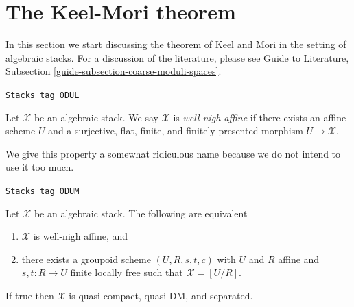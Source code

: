 \section{The Keel-Mori theorem}
\label{stacks-more-morphisms-section-Keel-Mori}
In this section we start discussing the theorem of Keel and Mori
in the setting of algebraic stacks. For a discussion of the
literature, please see Guide to Literature, Subsection
\ref{guide-subsection-coarse-moduli-spaces}.

\begin{definition}
\label{stacks-more-morphisms-definition-well-nigh-affine}
\href{https://stacks.math.columbia.edu/tag/0DUL}{\texttt{Stacks tag 0DUL}}

Let $\mathcal{X}$ be an algebraic stack. We say $\mathcal{X}$
is {\it well-nigh affine} if there exists an affine scheme $U$
and a surjective, flat, finite, and finitely presented morphism
$U \to \mathcal{X}$.
\end{definition}

We give this property a somewhat ridiculous name because we do not intend to
use it too much.

\begin{lemma}
\label{stacks-more-morphisms-lemma-well-nigh-affine}
\href{https://stacks.math.columbia.edu/tag/0DUM}{\texttt{Stacks tag 0DUM}}

Let $\mathcal{X}$ be an algebraic stack. The following are equivalent
\begin{enumerate}
\item $\mathcal{X}$ is well-nigh affine, and
\item there exists a groupoid scheme $(U, R, s, t, c)$ with $U$ and
$R$ affine and $s, t : R \to U$ finite locally free such that
$\mathcal{X} = [U/R]$.
\end{enumerate}
If true then $\mathcal{X}$ is quasi-compact, quasi-DM, and separated.
\end{lemma}

